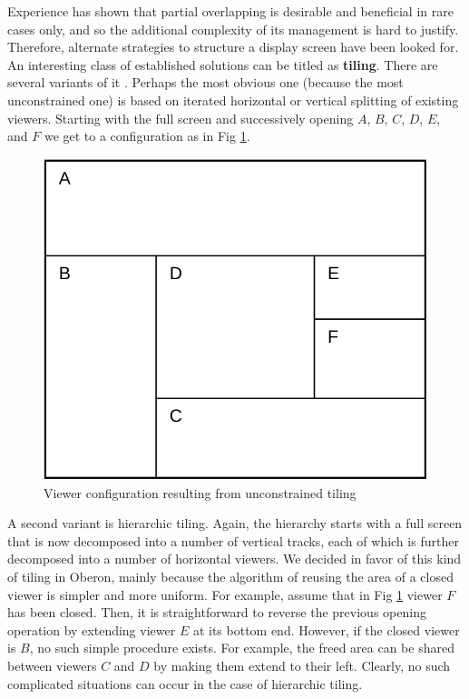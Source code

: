 Experience has shown that partial overlapping is desirable and beneficial in rare cases only, and
so the additional complexity of its management \cite{Binding, Wille} is hard to justify. Therefore,
alternate strategies to structure a display screen have been looked for. An interesting class of
established solutions can be titled as \textbf{tiling}. There are several variants of it \cite{Cohen}. 
Perhaps the most obvious one (because the most unconstrained one) is based on iterated horizontal or
vertical splitting of existing viewers. Starting with the full screen and successively opening
$A$, $B$, $C$, $D$, $E$, and $F$ we get to a configuration as in Fig \ref{fig:tiling}.
\begin{figure}
	\centering
	\includegraphics[width=.6\textwidth]{i/5}
	\caption{Viewer configuration resulting from unconstrained tiling}
	\label{fig:tiling}
\end{figure}
A second variant is hierarchic tiling. Again, the hierarchy starts with a full screen that is now
decomposed into a number of vertical tracks, each of which is further decomposed into a number
of horizontal viewers. We decided in favor of this kind of tiling in Oberon, mainly because the
algorithm of reusing the area of a closed viewer is simpler and more uniform. For example,
assume that in Fig \ref{fig:tiling} viewer $F$ has been closed. Then, it is straightforward to reverse the
previous opening operation by extending viewer $E$ at its bottom end. However, if the closed viewer
is $B$, no such simple procedure exists. For example, the freed area can be shared between
viewers $C$ and $D$ by making them extend to their left. Clearly, no such complicated situations can
occur in the case of hierarchic tiling.

